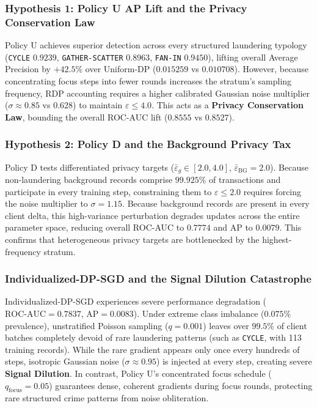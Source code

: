 \documentclass[conference]{IEEEtran}
\begin{document}
\subsubsection{Hypothesis 1: Policy U AP Lift and the Privacy Conservation Law}
Policy U achieves superior detection across every structured laundering typology (\texttt{CYCLE} $0.9239$, \texttt{GATHER-SCATTER} $0.8963$, \texttt{FAN-IN} $0.9450$), lifting overall Average Precision by $+42.5\%$ over Uniform-DP ($0.015259$ vs $0.010708$). However, because concentrating focus steps into fewer rounds increases the stratum's sampling frequency, RDP accounting requires a higher calibrated Gaussian noise multiplier ($\sigma \approx 0.85$ vs $0.628$) to maintain $\varepsilon \le 4.0$. This acts as a \textbf{Privacy Conservation Law}, bounding the overall ROC-AUC lift ($0.8555$ vs $0.8527$).

\subsubsection{Hypothesis 2: Policy D and the Background Privacy Tax}
Policy D tests differentiated privacy targets ($\bar{\varepsilon}_g \in [2.0, 4.0]$, $\bar{\varepsilon}_{\text{BG}} = 2.0$). Because non-laundering background records comprise $99.925\%$ of transactions and participate in every training step, constraining them to $\varepsilon \le 2.0$ requires forcing the noise multiplier to $\sigma = 1.15$. Because background records are present in every client delta, this high-variance perturbation degrades updates across the entire parameter space, reducing overall ROC-AUC to $0.7774$ and AP to $0.0079$. This confirms that heterogeneous privacy targets are bottlenecked by the highest-frequency stratum.

\subsubsection{Individualized-DP-SGD and the Signal Dilution Catastrophe}
Individualized-DP-SGD experiences severe performance degradation ($\text{ROC-AUC} = 0.7837$, $\text{AP} = 0.0083$). Under extreme class imbalance ($0.075\%$ prevalence), unstratified Poisson sampling ($q = 0.001$) leaves over $99.5\%$ of client batches completely devoid of rare laundering patterns (such as \texttt{CYCLE}, with 113 training records). While the rare gradient appears only once every hundreds of steps, isotropic Gaussian noise ($\sigma \approx 0.95$) is injected at every step, creating severe \textbf{Signal Dilution}. In contrast, Policy U's concentrated focus schedule ($q_{\text{focus}} = 0.05$) guarantees dense, coherent gradients during focus rounds, protecting rare structured crime patterns from noise obliteration.
\end{document}

